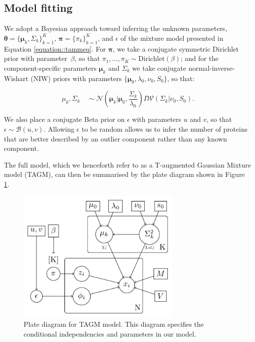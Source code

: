 \documentclass[12pt,english]{article}\usepackage[]{graphicx}\usepackage[]{color}
\begin{document}
\subsection{Model fitting}

We adopt a Bayesian approach toward inferring the unknown parameters,
$\boldsymbol{\theta} = \{\boldsymbol{\mu}_k, \Sigma_k \}_{k = 1}^K$,
$\boldsymbol{\pi} = \{\pi_k\}_{k = 1}^K$, and $\epsilon$ of the
mixture model presented in Equation \eqref{equation::tammeq}.  For
$\boldsymbol{\pi}$, we take a conjugate symmetric Dirichlet prior with
parameter~$\beta$, so that
$\pi_1, \ldots, \pi_K \sim \mbox{Dirichlet}(\beta)$; and for the
component-specific parameters $\boldsymbol{\mu}_k$ and $\Sigma_k$ we
take conjugate normal-inverse-Wishart (NIW) priors with parameters
$\{\boldsymbol{\mu}_0, \lambda_0, \nu_0, S_0\}$, so that:

\begin{equation} \label{equation::prior}
  \mu_k, \Sigma_k \quad \sim \mathcal{N}\left(\boldsymbol{\mu}_k|\boldsymbol{\mu}_0, \frac{\Sigma_{k}}{\lambda_0}\right)I\mathcal{W}\left(\Sigma_{k}|\nu_0, S_0\right).
\end{equation}

We also place a conjugate Beta prior on $\epsilon$ with parameters $u$
and $v$, so that $\epsilon \sim \mathcal{B}(u,v)$.  Allowing
$\epsilon$ to be random allows us to infer the number of proteins that
are better described by an outlier component rather than any known
component.

The full model, which we henceforth refer to as a T-augmented Gaussian
Mixture model (TAGM), can then be summarised by the plate diagram
shown in Figure \ref{plateDiagram}.

\begin{figure}[H]
  \includegraphics[width=8cm]{graphmodel2.pdf}
  \centering
  \caption{Plate diagram for TAGM model. This diagram specifies the
    conditional independencies and parameters in our
    model.}\label{plateDiagram}
\end{figure}
\end{document}
